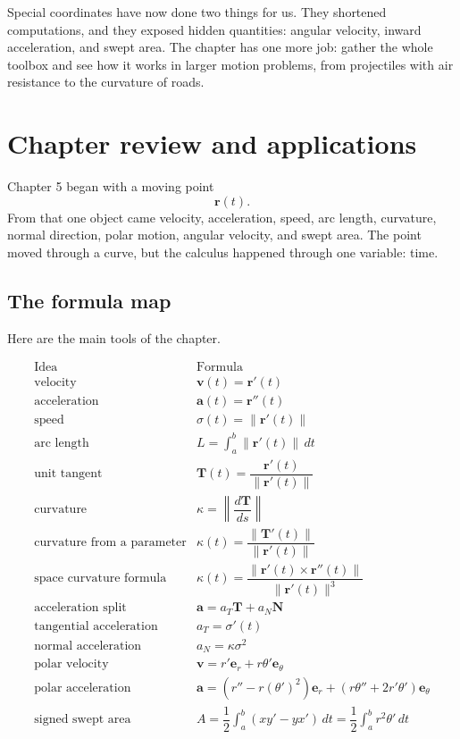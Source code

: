 Special coordinates have now done two things for us.  They shortened computations,
and they exposed hidden quantities: angular velocity, inward acceleration, and swept
area.  The chapter has one more job: gather the whole toolbox and see how it works in
larger motion problems, from projectiles with air resistance to the curvature of roads.

\section{Chapter review and applications}
\label{sec:5.6}


Chapter 5 began with a moving point
\[
    \mathbf r(t).
\]
From that one object came velocity, acceleration, speed, arc length, curvature, normal
direction, polar motion, angular velocity, and swept area.  The point moved through a
curve, but the calculus happened through one variable: time.

\subsection{The formula map}

Here are the main tools of the chapter.

\[
\begin{array}{c|c}
\text{Idea} & \text{Formula} \\ \hline
\text{velocity} & \mathbf v(t)=\mathbf r'(t)\\[1mm]
\text{acceleration} & \mathbf a(t)=\mathbf r''(t)\\[1mm]
\text{speed} & \sigma(t)=\|\mathbf r'(t)\|\\[1mm]
\text{arc length} & L=\displaystyle\int_a^b \|\mathbf r'(t)\|\,dt\\[3mm]
\text{unit tangent} & \mathbf T(t)=\dfrac{\mathbf r'(t)}{\|\mathbf r'(t)\|}\\[4mm]
\text{curvature} & \kappa=\left\|\dfrac{d\mathbf T}{ds}\right\|\\[4mm]
\text{curvature from a parameter} &
\kappa(t)=\dfrac{\|\mathbf T'(t)\|}{\|\mathbf r'(t)\|}\\[4mm]
\text{space curvature formula} &
\kappa(t)=\dfrac{\|\mathbf r'(t)\times\mathbf r''(t)\|}{\|\mathbf r'(t)\|^3}\\[4mm]
\text{acceleration split} &
\mathbf a=a_T\mathbf T+a_N\mathbf N\\[1mm]
\text{tangential acceleration} & a_T=\sigma'(t)\\[1mm]
\text{normal acceleration} & a_N=\kappa\sigma^2\\[1mm]
\text{polar velocity} &
\mathbf v=r'\mathbf e_r+r\theta'\mathbf e_\theta\\[1mm]
\text{polar acceleration} &
\mathbf a=(r''-r(\theta')^2)\mathbf e_r+(r\theta''+2r'\theta')\mathbf e_\theta\\[1mm]
\text{signed swept area} &
A=\dfrac12\displaystyle\int_a^b (xy'-yx')\,dt
=\dfrac12\displaystyle\int_a^b r^2\theta'\,dt
\end{array}
\]

